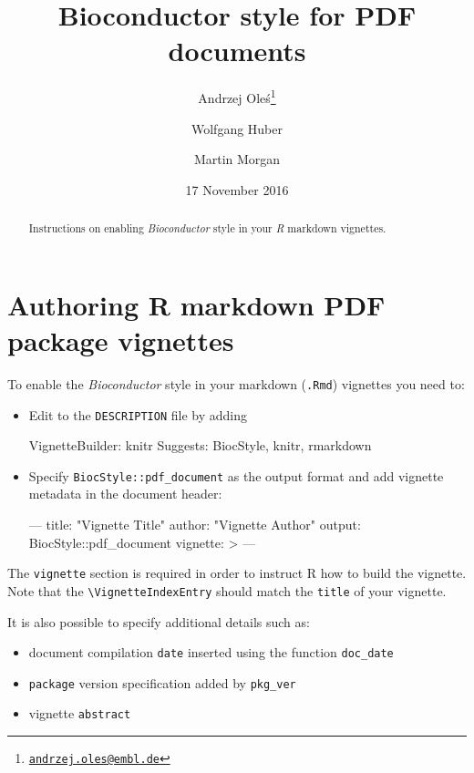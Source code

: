\documentclass[]{article}
\title{Bioconductor style for PDF documents}
\author{Andrzej Oleś\thanks{\ttfamily\href{mailto:andrzej.oles@embl.de}{\nolinkurl{andrzej.oles@embl.de}}}}
\author{Wolfgang Huber}
\affil{European Molecular Biology Laboratory, Heidelberg}  \author{Martin Morgan}
\affil{Roswell Park Cancer Institute, Bufallo}  \preauthor{\centering\large\emph}
\date{17 November 2016}
\providecommand{\tightlist}{%
  \setlength{\itemsep}{0pt}\setlength{\parskip}{0pt}}
\renewenvironment{verbatim}{\color{codecolor}\begin{myshaded}\begin{oldverbatim}}{\end{oldverbatim}\end{myshaded}}
\begin{document}
\maketitle
\begin{abstract}
Instructions on enabling \emph{Bioconductor} style in your \emph{R}
markdown vignettes.
\end{abstract}


{
\setcounter{tocdepth}{2}
\tableofcontents
\newpage
}
\section{Authoring R markdown PDF package
vignettes}\label{authoring-r-markdown-pdf-package-vignettes}

To enable the \emph{Bioconductor} style in your markdown (\texttt{.Rmd})
vignettes you need to:

\begin{itemize}
\item
  Edit to the \texttt{DESCRIPTION} file by adding

\begin{verbatim}
VignetteBuilder: knitr
Suggests: BiocStyle, knitr, rmarkdown
\end{verbatim}
\item
  Specify \texttt{BiocStyle::pdf\_document} as the output format and add
  vignette metadata in the document header:

\begin{verbatim}
---
title: "Vignette Title"
author: "Vignette Author"
output: 
  BiocStyle::pdf_document
vignette: >
  %\VignetteIndexEntry{Vignette Title}
  %\VignetteEngine{knitr::rmarkdown}
  %\VignetteEncoding{UTF-8}  
---
\end{verbatim}
\end{itemize}

The \texttt{vignette} section is required in order to instruct R how to
build the vignette. Note that the
\texttt{\textbackslash{}VignetteIndexEntry} should match the
\texttt{title} of your vignette.

It is also possible to specify additional details such as:

\begin{itemize}
\tightlist
\item
  document compilation \texttt{date} inserted using the function
  \texttt{doc\_date}
\item
  \texttt{package} version specification added by \texttt{pkg\_ver}
\item
  vignette \texttt{abstract}
\end{itemize}
\end{document}
